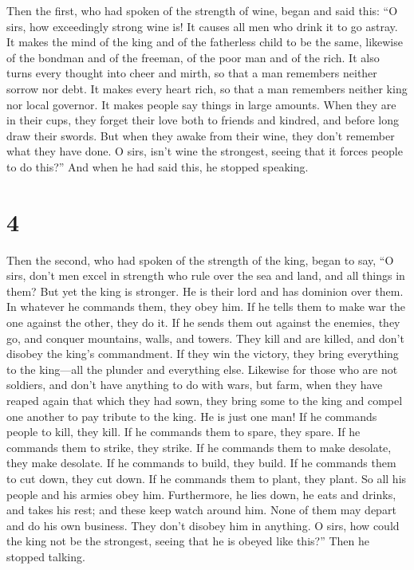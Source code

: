 Then the first, who had spoken of the strength of wine, began
 and said this: ``O sirs, how exceedingly strong wine is!
It causes all men who drink it to go astray.  It makes
the mind of the king and of the fatherless child to be the same,
likewise of the bondman and of the freeman, of the poor man and of the
rich.  It also turns every thought into cheer and mirth,
so that a man remembers neither sorrow nor debt.  It
makes every heart rich, so that a man remembers neither king nor local
governor. It makes people say things in large amounts. 
When they are in their cups, they forget their love both to friends and
kindred, and before long draw their swords.  But when
they awake from their wine, they don't remember what they have done.
 O sirs, isn't wine the strongest, seeing that it forces
people to do this?'' And when he had said this, he stopped speaking.

\hypertarget{section-3}{%
\section{4}\label{section-3}}

 Then the second, who had spoken of the strength of the
king, began to say,  ``O sirs, don't men excel in strength
who rule over the sea and land, and all things in them? 
But yet the king is stronger. He is their lord and has dominion over
them. In whatever he commands them, they obey him.  If he
tells them to make war the one against the other, they do it. If he
sends them out against the enemies, they go, and conquer mountains,
walls, and towers.  They kill and are killed, and don't
disobey the king's commandment. If they win the victory, they bring
everything to the king---all the plunder and everything else.
 Likewise for those who are not soldiers, and don't have
anything to do with wars, but farm, when they have reaped again that
which they had sown, they bring some to the king and compel one another
to pay tribute to the king.  He is just one man! If he
commands people to kill, they kill. If he commands them to spare, they
spare.  If he commands them to strike, they strike. If he
commands them to make desolate, they make desolate. If he commands to
build, they build.  If he commands them to cut down, they
cut down. If he commands them to plant, they plant.  So
all his people and his armies obey him. Furthermore, he lies down, he
eats and drinks, and takes his rest;  and these keep
watch around him. None of them may depart and do his own business. They
don't disobey him in anything.  O sirs, how could the
king not be the strongest, seeing that he is obeyed like this?'' Then he
stopped talking.

